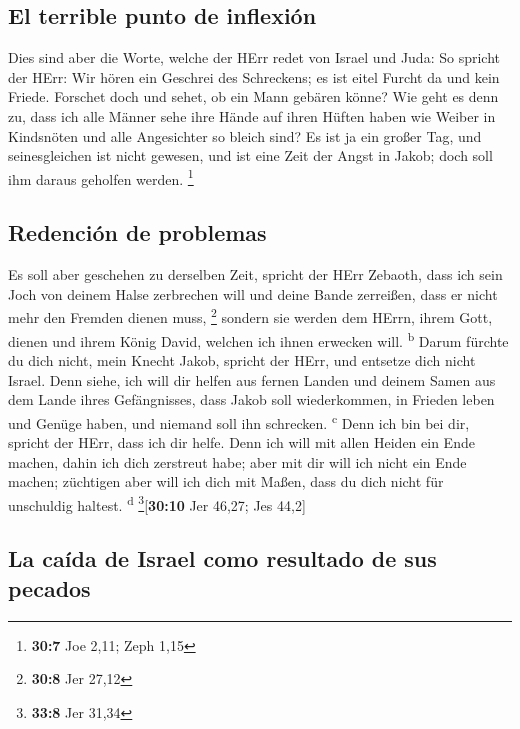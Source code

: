 \hypertarget{el-terrible-punto-de-inflexiuxf3n}{%
\subsection{El terrible punto de
inflexión}\label{el-terrible-punto-de-inflexiuxf3n}}

 Dies sind aber die Worte, welche der HErr redet von
Israel und Juda:  So spricht der HErr: Wir hören ein
Geschrei des Schreckens; es ist eitel Furcht da und kein Friede.
 Forschet doch und sehet, ob ein Mann gebären könne? Wie
geht es denn zu, dass ich alle Männer sehe ihre Hände auf ihren Hüften
haben wie Weiber in Kindsnöten und alle Angesichter so bleich sind?
 Es ist ja ein großer Tag, und seinesgleichen ist nicht
gewesen, und ist eine Zeit der Angst in Jakob; doch soll ihm daraus
geholfen werden. \footnote{\textbf{30:7} Joe 2,11; Zeph 1,15}

\hypertarget{redenciuxf3n-de-problemas}{%
\subsection{Redención de problemas}\label{redenciuxf3n-de-problemas}}

 Es soll aber geschehen zu derselben Zeit, spricht der
HErr Zebaoth, dass ich sein Joch von deinem Halse zerbrechen will und
deine Bande zerreißen, dass er nicht mehr den Fremden dienen muss,
\footnote{\textbf{30:8} Jer 27,12}  sondern sie werden dem
HErrn, ihrem Gott, dienen und ihrem König David, welchen ich ihnen
erwecken will. \textsuperscript{b}  Darum fürchte du dich
nicht, mein Knecht Jakob, spricht der HErr, und entsetze dich nicht
Israel. Denn siehe, ich will dir helfen aus fernen Landen und deinem
Samen aus dem Lande ihres Gefängnisses, dass Jakob soll wiederkommen, in
Frieden leben und Genüge haben, und niemand soll ihn schrecken.
\textsuperscript{c}  Denn ich bin bei dir, spricht der
HErr, dass ich dir helfe. Denn ich will mit allen Heiden ein Ende
machen, dahin ich dich zerstreut habe; aber mit dir will ich nicht ein
Ende machen; züchtigen aber will ich dich mit Maßen, dass du dich nicht
für unschuldig haltest. \textsuperscript{d} \footnote{\textbf{33:8} Jer
  31,34}{[}\textbf{30:10} Jer 46,27; Jes 44,2{]}

\hypertarget{la-cauxedda-de-israel-como-resultado-de-sus-pecados}{%
\subsection{La caída de Israel como resultado de sus
pecados}\label{la-cauxedda-de-israel-como-resultado-de-sus-pecados}}

